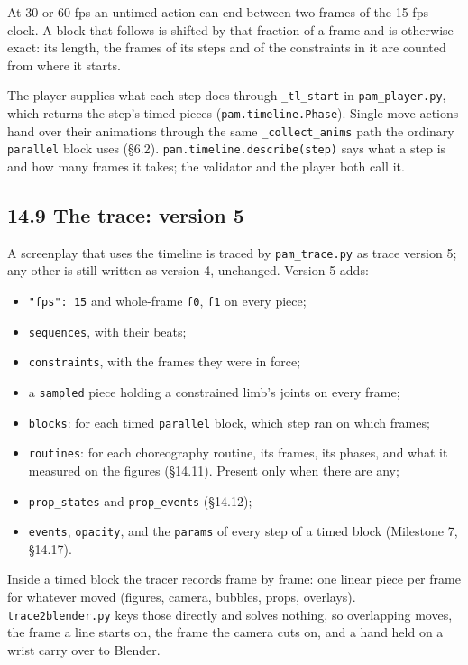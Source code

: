 \documentclass[
  12pt,
  letterpaper,
]{book}
\providecommand{\tightlist}{%
  \setlength{\itemsep}{0pt}\setlength{\parskip}{0pt}}
\begin{document}
At 30 or 60 fps an untimed action can end between two frames of the
15 fps clock. A block that follows is shifted by that fraction of a
frame and is otherwise exact: its length, the frames of its steps and
of the constraints in it are counted from where it starts.

The player supplies what each step does through \texttt{\_tl\_start}
in \texttt{pam\_player.py}, which returns the step's timed pieces
(\texttt{pam.timeline.Phase}). Single-move actions hand over their
animations through the same \texttt{\_collect\_anims} path the ordinary
\texttt{parallel} block uses (\S6.2).
\texttt{pam.timeline.describe(step)} says what a step is and how many
frames it takes; the validator and the player both call it.

\subsection{14.9 The trace: version 5}\label{trace-version-5}

A screenplay that uses the timeline is traced by \texttt{pam\_trace.py}
as trace version 5; any other is still written as version 4, unchanged.
Version 5 adds:

\begin{itemize}
\tightlist
\item
  \texttt{"fps": 15} and whole-frame \texttt{f0}, \texttt{f1} on every
  piece;
\item
  \texttt{sequences}, with their beats;
\item
  \texttt{constraints}, with the frames they were in force;
\item
  a \texttt{sampled} piece holding a constrained limb's joints on every
  frame;
\item
  \texttt{blocks}: for each timed \texttt{parallel} block, which step
  ran on which frames;
\item
  \texttt{routines}: for each choreography routine, its frames, its
  phases, and what it measured on the figures (\S14.11). Present only
  when there are any;
\item
  \texttt{prop\_states} and \texttt{prop\_events} (\S14.12);
\item
  \texttt{events}, \texttt{opacity}, and the \texttt{params} of every
  step of a timed block (Milestone 7, \S14.17).
\end{itemize}

Inside a timed block the tracer records frame by frame: one linear
piece per frame for whatever moved (figures, camera, bubbles, props,
overlays). \texttt{trace2blender.py} keys those directly and solves
nothing, so overlapping moves, the frame a line starts on, the frame
the camera cuts on, and a hand held on a wrist carry over to Blender.
\end{document}
